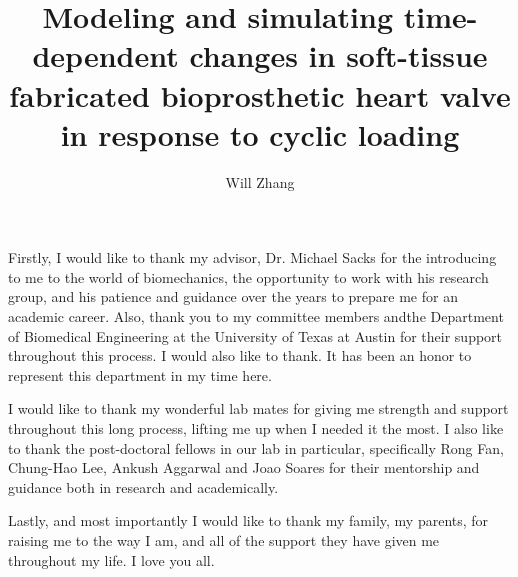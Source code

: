 \documentclass[12pt]{report}
\author{Will Zhang}  	%
\title{Modeling and simulating time-dependent changes in soft-tissue fabricated bioprosthetic heart valve in response to cyclic loading}
\begin{document}
\copyrightpage          %

%
%
\commcertpage           %

\titlepage              %

%

\begin{acknowledgments}		%
%
    Firstly, I would like to thank my advisor, Dr. Michael Sacks for the introducing to me to the world of biomechanics, the opportunity to work with his research group, and his patience and guidance over the years to prepare me for an academic career. Also, thank you to my committee members andthe Department of Biomedical Engineering at the University of Texas at Austin for their support throughout this process. I would also like to thank. It has been an honor to represent this department in my time here.
    

    I would like to thank my wonderful lab mates for giving me strength and support throughout this long process, lifting me up when I needed it the most. I also like to thank the post-doctoral fellows in our lab in particular, specifically Rong Fan, Chung-Hao Lee, Ankush Aggarwal and Joao Soares for their mentorship and guidance both in research and academically.
    

    Lastly, and most importantly I would like to thank my family, my parents, for raising me to the way I am, and all of the support they have given me throughout my life. I love you all.
\end{acknowledgments}
\end{document}
